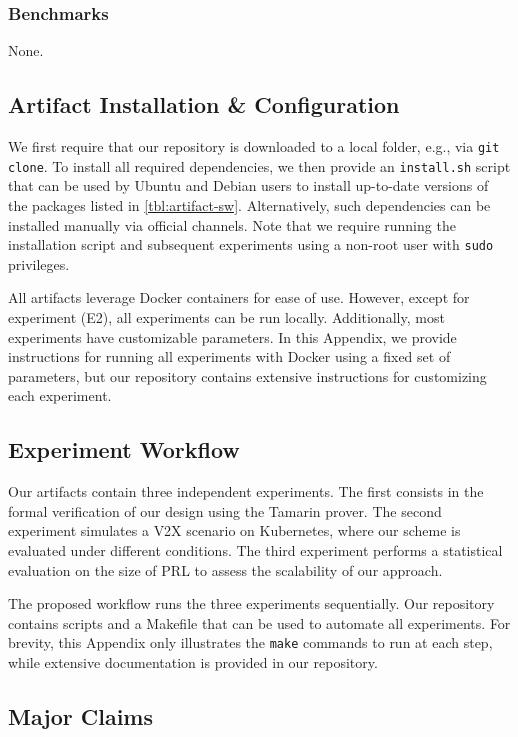 \subsubsection{Benchmarks} 
None.

\subsection{Artifact Installation \& Configuration}
\label{artifact:configuration}

We first require that our repository is downloaded to a local folder, e.g., via
\texttt{git clone}. To install all required dependencies, we then provide an
\texttt{install.sh} script that can be used by Ubuntu and Debian users to
install up-to-date versions of the packages listed in \cref{tbl:artifact-sw}.
Alternatively, such dependencies can be installed manually via official
channels. Note that we require running the installation script and subsequent
experiments using a non-root user with \texttt{sudo} privileges.

All artifacts leverage Docker containers for ease of use. However, except for
experiment (E2), all experiments can be run locally. Additionally, most
experiments have customizable parameters. In this Appendix, we provide
instructions for running all experiments with Docker using a fixed set of
parameters, but our repository contains extensive instructions for customizing
each experiment.

\subsection{Experiment Workflow}

Our artifacts contain three independent experiments. The first consists in the
formal verification of our design using the Tamarin prover. The second
experiment simulates a \ac{V2X} scenario on Kubernetes, where our scheme is
evaluated under different conditions. The third experiment performs a
statistical evaluation on the size of \ac{PRL} to assess the scalability of our
approach.

The proposed workflow runs the three experiments sequentially. Our repository
contains scripts and a Makefile that can be used to automate all experiments.
For brevity, this Appendix only illustrates the \texttt{make} commands to run at
each step, while extensive documentation is provided in our repository.

\subsection{Major Claims}

